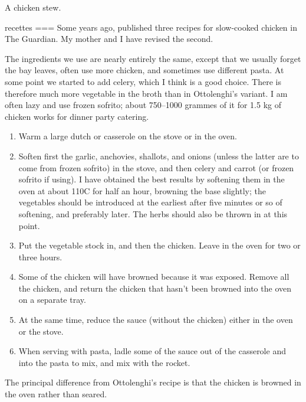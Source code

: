 A chicken stew.

recettes
===
Some years ago, \textcite{ottolenghi2017} published three recipes for slow-cooked chicken in The Guardian. My mother and I have revised the second.

The ingredients we use are nearly entirely the same, except that we usually forget the bay leaves, often use more chicken, and sometimes use different pasta. At some point we started to add celery, which I think is a good choice. There is therefore much more vegetable in the broth than in Ottolenghi’s variant. I am often lazy and use frozen sofrito; about 750–1000 grammes of it for 1.5 kg of chicken works for dinner party catering.
\begin{enumerate}
\item    Warm a large dutch or casserole on the stove or in the oven.
\item    Soften first the garlic, anchovies, shallots, and onions (unless the latter are to come from frozen sofrito) in the stove, and then celery and carrot (or frozen sofrito if using). I have obtained the best results by softening them in the oven at about 110C for half an hour, browning the base slightly; the vegetables should be introduced at the earliest after five minutes or so of softening, and preferably later. The herbs should also be thrown in at this point.
\item    Put the vegetable stock in, and then the chicken. Leave in the oven for two or three hours.
\item    Some of the chicken will have browned because it was exposed. Remove all the chicken, and return the chicken that hasn’t been browned into the oven on a separate tray.
\item    At the same time, reduce the sauce (without the chicken) either in the oven or the stove.
\item    When serving with pasta, ladle some of the sauce out of the casserole and into the pasta to mix, and mix with the rocket.
\end{enumerate}

The principal difference from Ottolenghi’s recipe is that the chicken is browned in the oven rather than seared.